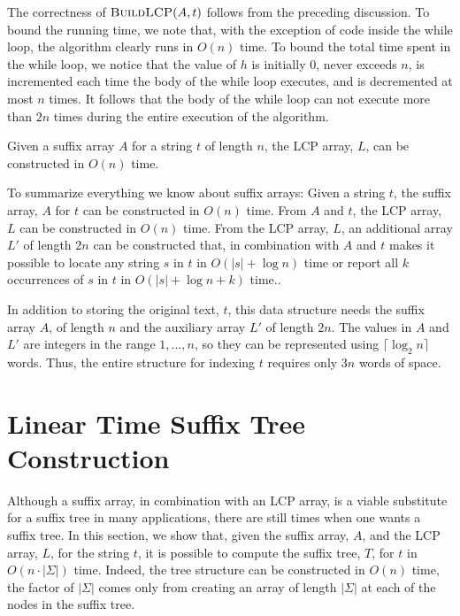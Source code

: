 The correctness of $\textsc{BuildLCP}(A,t)$ follows from the preceding
discussion. To bound the running time, we note that, with the exception of
code inside the while loop, the algorithm clearly runs in $O(n)$ time. To
bound the total time spent in the while loop, we notice that the value
of $h$ is initially 0, never exceeds $n$, is incremented each time the
body of the while loop executes, and is decremented at most $n$ times.
It follows that the body of the while loop can not execute more than $2n$
times during the entire execution of the algorithm.

\begin{thm}
  Given a suffix array $A$ for a string $t$ of length $n$, the LCP array, 
  $L$, can be constructed in $O(n)$ time.
\end{thm}

To summarize everything we know about suffix arrays:  Given a string $t$,
the suffix array, $A$ for $t$ can be constructed in $O(n)$ time. From
$A$ and $t$, the LCP array, $L$ can be constructed in $O(n)$ time.
From the LCP array, $L$, an additional array $L'$ of length $2n$ can be
constructed that, in combination with $A$ and $t$ makes it possible to
locate any string $s$ in $t$ in $O(|s|+\log n)$ time or report all $k$
occurrences of $s$ in $t$ in $O(|s|+\log n+ k)$ time..

In addition to storing the original text, $t$, this data structure needs
the suffix array $A$, of length $n$ and the auxiliary array $L'$ of length
$2n$. The values in $A$ and $L'$ are integers in the range $1,\ldots,n$,
so they can be represented using $\lceil\log_2 n\rceil$ words.  Thus,
the entire structure for indexing $t$ requires only $3n$ words of space.

\section{Linear Time Suffix Tree Construction}

Although a suffix array, in combination with an LCP array, is a viable substitute for a suffix tree in many applications, there are still times when one wants a suffix tree.  In this section, we show that, given the suffix array, $A$, and the LCP array, $L$, for the string $t$, it is possible to compute the suffix tree, $T$, for $t$ in $O(n\cdot|\Sigma|)$ time.  Indeed, the tree structure can be constructed in $O(n)$ time, the factor of $|\Sigma|$ comes only from creating an array of length $|\Sigma|$ at each of the nodes in the suffix tree.

